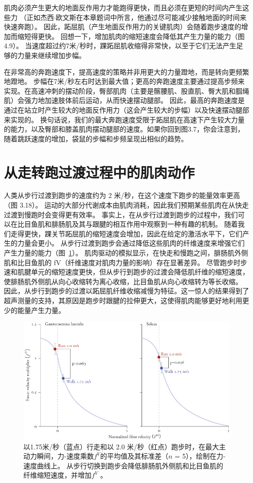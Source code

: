 肌肉必须产生更大的地面反作用力才能跑得更快，而且必须在更短的时间内产生这些力
（正如杰西$\cdot$欧文斯在本章题词中所言，他通过尽可能减少接触地面的时间来快速奔跑）。
因此，跖屈肌（产生地面反作用力的关键肌肉）会随着跑步速度的增加而缩短得更快。
回想一下，增加肌肉的缩短速度会降低其产生力量的能力（图4.9）。
当速度超过约7米/秒时，踝跖屈肌收缩得非常快，以至于它们无法产生足够的力量来继续增加步幅。


在非常高的奔跑速度下，提高速度的策略并非用更大的力量蹬地，而是转向更频繁地蹬地。
步幅在7米/秒左右时达到最大值；更高的奔跑速度主要通过提高步频来实现。在高速冲刺的摆动阶段，臀部肌肉（主要是髂腰肌、股直肌、臀大肌和腘绳肌）会强力地加速肢体前后运动，从而快速摆动腿部。
因此，最高的奔跑速度是通过在站立时产生较大的地面反作用力（这会产生较大的步幅）以及快速摆动腿部来实现的。
换句话说，我们的最大奔跑速度受限于跖屈肌在高速下产生较大力量的能力，以及臀部和膝盖肌肉摆动腿部的速度。如果你回到图3.7，你会注意到，随着跳跃速度的增加，袋鼠的步幅和步频呈现出相似的趋势。


\section{从走转跑过渡过程中的肌肉动作}

人类从步行过渡到跑步的速度约为 2 米/秒，在这个速度下跑步的能量效率更高（图 3.18）。
运动的大部分代谢成本由肌肉消耗，因此我们预期某些肌肉在从快走过渡到慢跑时会变得更有效率。
事实上，在从步行过渡到跑步的过程中，我们可以在比目鱼肌和腓肠肌及其与跟腱的相互作用中观察到一种有趣的机制。
随着我们走得更快，踝关节跖屈肌的缩短速度会增加，因此在给定的激活水平下，它们产生的力量会更小。
从步行过渡到跑步会通过降低这些肌肉的纤维速度来增强它们产生力量的能力（图~\ref{fig:12_6}）。
肌肉驱动的模拟显示，在快走和慢跑之间，腓肠肌外侧肌和比目鱼肌的 fV（纤维速度对肌肉力量的影响）存在显著差异。
尽管跑步时步速和肌腱单元的缩短速度更快，但从步行到跑步的过渡会降低肌纤维的缩短速度，使腓肠肌外侧肌从向心收缩转为离心收缩，比目鱼肌从向心收缩转为等长收缩。
因此，从步行到跑步的过渡以跖屈肌纤维收缩减慢为特征。这一惊人的结果得到了超声测量\cite{farris2012human}的支持，其原因是跑步时跟腱的拉伸更大，这使得肌肉能够更好地利用更少的能量产生力量。


\begin{figure}[!htb]
	\centering
	\includegraphics[width=0.8\linewidth]{chap12/12_6}
	\caption{以1.75米/秒（蓝点）行走和以 2.0 米/秒（红点）跑步时，在最大主动力瞬间，力-速度乘数$f^V$的平均值及其标准差（$n$ = 5），绘制在力-速度曲线上。
		从步行切换到跑步会降低腓肠肌外侧肌和比目鱼肌的纤维缩短速度，并增加$f^V$ \cite{arnold2013muscle}。 \label{fig:12_6}}
\end{figure}


